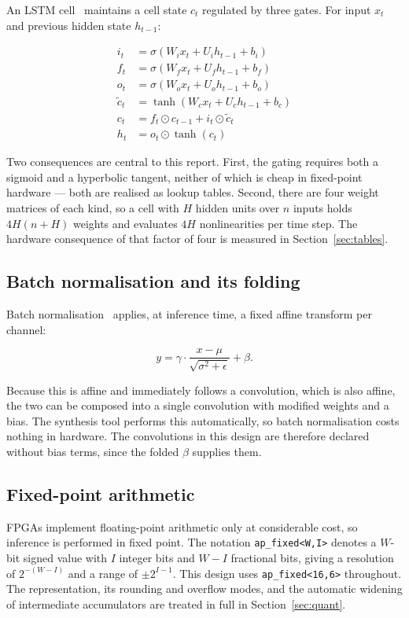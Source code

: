\documentclass[11pt,a4paper]{article}
\begin{document}
An LSTM cell~\cite{hochreiter1997} maintains a cell state $c_t$ regulated by
three gates. For input $x_t$ and previous hidden state $h_{t-1}$:

\begin{align}
i_t &= \sigma(W_i x_t + U_i h_{t-1} + b_i) \\
f_t &= \sigma(W_f x_t + U_f h_{t-1} + b_f) \\
o_t &= \sigma(W_o x_t + U_o h_{t-1} + b_o) \\
\tilde{c}_t &= \tanh(W_c x_t + U_c h_{t-1} + b_c) \\
c_t &= f_t \odot c_{t-1} + i_t \odot \tilde{c}_t \\
h_t &= o_t \odot \tanh(c_t)
\end{align}

Two consequences are central to this report. First, the gating requires both a
sigmoid and a hyperbolic tangent, neither of which is cheap in fixed-point
hardware --- both are realised as lookup tables. Second, there are four weight
matrices of each kind, so a cell with $H$ hidden units over $n$ inputs holds
$4H(n + H)$ weights and evaluates $4H$ nonlinearities per time step. The
hardware consequence of that factor of four is measured in
Section~\ref{sec:tables}.

\subsection{Batch normalisation and its folding}

Batch normalisation~\cite{ioffe2015} applies, at inference time, a fixed affine
transform per channel:

\begin{equation}
y = \gamma \cdot \frac{x - \mu}{\sqrt{\sigma^2 + \epsilon}} + \beta .
\end{equation}

Because this is affine and immediately follows a convolution, which is also
affine, the two can be composed into a single convolution with modified weights
and a bias. The synthesis tool performs this automatically, so batch
normalisation costs nothing in hardware. The convolutions in this design are
therefore declared without bias terms, since the folded $\beta$ supplies them.

\subsection{Fixed-point arithmetic}

FPGAs implement floating-point arithmetic only at considerable cost, so
inference is performed in fixed point. The notation
\texttt{ap\_fixed<W,I>} denotes a $W$-bit signed value with $I$ integer bits and
$W - I$ fractional bits, giving a resolution of $2^{-(W-I)}$ and a range of
$\pm 2^{I-1}$. This design uses \texttt{ap\_fixed<16,6>} throughout. The representation, its
rounding and overflow modes, and the automatic widening of intermediate
accumulators are treated in full in Section~\ref{sec:quant}.
\end{document}
